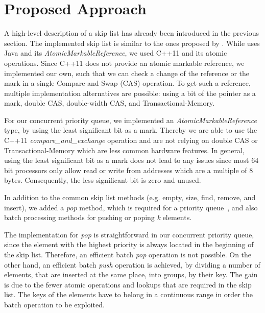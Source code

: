 \section{Proposed Approach}\label{sec:approach}
A high-level description of a skip list has already been introduced in the previous section. The implemented skip list is similar to the ones proposed by \cite{Herlihy:2008:AMP:1734069, Sundell:2005:FLC:1073765.1073770}. While \cite{Herlihy:2008:AMP:1734069} uses Java and its \textit{AtomicMarkableReference}, we used C++11 and its atomic operations. Since C++11 does not provide an atomic markable reference, we implemented our own, such that we can check a change of the reference or the mark in a single Compare-and-Swap (CAS) operation. To get such a reference, multiple implementation alternatives are possible: using a bit of the pointer as a mark, double CAS, double-width CAS, and Transactional-Memory.

For our concurrent priority queue, we implemented an \textit{AtomicMarkableReference} type, by using the least significant bit as a mark. Thereby we are able to use the C++11 {\em compare\_and\_exchange} operation and are not relying on double CAS or Transactional-Memory which are less common hardware features.
In general, using the least significant bit as a mark does not lead to any issues since most 64\,bit processors only allow read or write from addresses which are a multiple of 8\,bytes.
Consequently, the less significant bit is zero and unused.

In addition to the common skip list methods (e.g. empty, size, find, remove, and insert), we added a \textit{pop} method, which is required for a priority queue~\cite{Herlihy:2008:AMP:1734069}, and also batch processing methods for pushing or poping \textit{k} elements.

The implementation for \textit{pop} is straightforward in our concurrent priority queue, since the element with the highest priority is always located in the beginning of the skip list.
Therefore, an efficient batch \textit{pop} operation is not possible.
On the other hand, an efficient batch \textit{push} operation is achieved, by dividing a number of elements, that are inserted at the same place, into groups, by their key.
The gain is due to the fewer atomic operations and lookups that are required in the skip list.
The keys of the elements have to belong in a continuous range in order the batch operation to be exploited.


